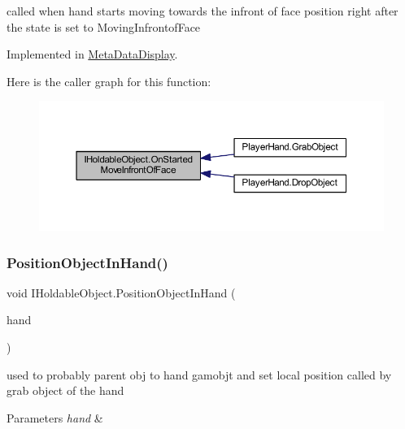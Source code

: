 called when hand starts moving towards the infront of face position right after the state is set to Moving\+Infrontof\+Face 



Implemented in \mbox{\hyperlink{class_meta_data_display_aa0a9b9ca8243943104c82602e69a0541}{Meta\+Data\+Display}}.

Here is the caller graph for this function\+:
\nopagebreak
\begin{figure}[H]
\begin{center}
\leavevmode
\includegraphics[width=350pt]{interface_i_holdable_object_af5dcdd5524539104706dadd8a0e15e08_icgraph}
\end{center}
\end{figure}
\mbox{\label{interface_i_holdable_object_a3fe2e7a7d0740225142053583f438333}} 
\subsubsection{\texorpdfstring{Position\+Object\+In\+Hand()}{PositionObjectInHand()}}
{\footnotesize\ttfamily void I\+Holdable\+Object.\+Position\+Object\+In\+Hand (\begin{DoxyParamCaption}\item[{\mbox{\hyperlink{class_player_hand}{Player\+Hand}}}]{hand }\end{DoxyParamCaption})}



used to probably parent obj to hand gamobjt and set local position called by grab object of the hand 


\begin{DoxyParams}{Parameters}
{\em hand} & \\
\hline
\end{DoxyParams}


